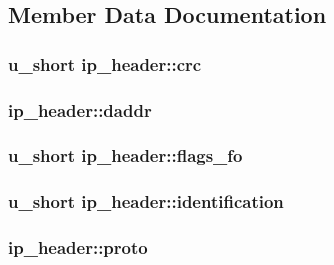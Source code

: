 \subsection{\-Member \-Data \-Documentation}
\hypertarget{structip__header_a5c25739369b6383e236ea81e840eabd7}{
\subsubsection[{crc}]{\setlength{\rightskip}{0pt plus 5cm}u\-\_\-short {\bf ip\-\_\-header\-::crc}}}\label{structip__header_a5c25739369b6383e236ea81e840eabd7}
\hypertarget{structip__header_ac2f83398880dc1299e50da631eb44911}{
\subsubsection[{daddr}]{ {\bf ip\-\_\-header\-::daddr}}}\label{structip__header_ac2f83398880dc1299e50da631eb44911}
\hypertarget{structip__header_ac55a50eeceb2167dc1e13b12b4644920}{
\subsubsection[{flags\-\_\-fo}]{\setlength{\rightskip}{0pt plus 5cm}u\-\_\-short {\bf ip\-\_\-header\-::flags\-\_\-fo}}}\label{structip__header_ac55a50eeceb2167dc1e13b12b4644920}
\hypertarget{structip__header_a076993a245f166daecc00e5526d1e3a1}{
\subsubsection[{identification}]{\setlength{\rightskip}{0pt plus 5cm}u\-\_\-short {\bf ip\-\_\-header\-::identification}}}\label{structip__header_a076993a245f166daecc00e5526d1e3a1}
\hypertarget{structip__header_a6f82f74102352fb10e179da3c7faffde}{
\subsubsection[{proto}]{ {\bf ip\-\_\-header\-::proto}}}\label{structip__header_a6f82f74102352fb10e179da3c7faffde}
